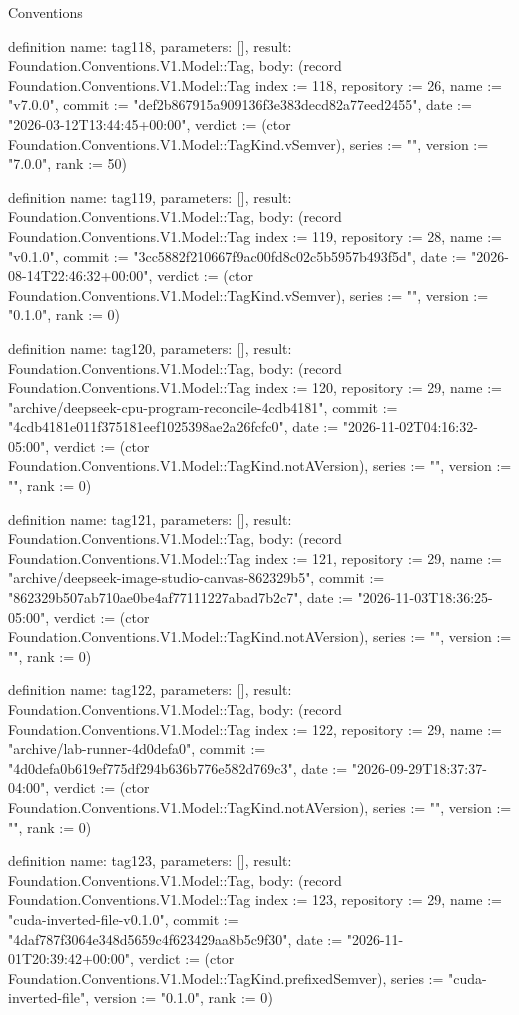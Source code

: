 \begin{lexlean}{Conventions}
\begin{semanticmodule}
definition{
  name: tag118,
  parameters: [],
  result: Foundation.Conventions.V1.Model::Tag,
  body: (record Foundation.Conventions.V1.Model::Tag {index := 118, repository := 26, name := "v7.0.0", commit := "def2b867915a909136f3e383decd82a77eed2455", date := "2026-03-12T13:44:45+00:00", verdict := (ctor Foundation.Conventions.V1.Model::TagKind.vSemver), series := "", version := "7.0.0", rank := 50})
}

definition{
  name: tag119,
  parameters: [],
  result: Foundation.Conventions.V1.Model::Tag,
  body: (record Foundation.Conventions.V1.Model::Tag {index := 119, repository := 28, name := "v0.1.0", commit := "3cc5882f210667f9ac00fd8c02c5b5957b493f5d", date := "2026-08-14T22:46:32+00:00", verdict := (ctor Foundation.Conventions.V1.Model::TagKind.vSemver), series := "", version := "0.1.0", rank := 0})
}

definition{
  name: tag120,
  parameters: [],
  result: Foundation.Conventions.V1.Model::Tag,
  body: (record Foundation.Conventions.V1.Model::Tag {index := 120, repository := 29, name := "archive/deepseek-cpu-program-reconcile-4cdb4181", commit := "4cdb4181e011f375181eef1025398ae2a26fcfc0", date := "2026-11-02T04:16:32-05:00", verdict := (ctor Foundation.Conventions.V1.Model::TagKind.notAVersion), series := "", version := "", rank := 0})
}

definition{
  name: tag121,
  parameters: [],
  result: Foundation.Conventions.V1.Model::Tag,
  body: (record Foundation.Conventions.V1.Model::Tag {index := 121, repository := 29, name := "archive/deepseek-image-studio-canvas-862329b5", commit := "862329b507ab710ae0be4af77111227abad7b2c7", date := "2026-11-03T18:36:25-05:00", verdict := (ctor Foundation.Conventions.V1.Model::TagKind.notAVersion), series := "", version := "", rank := 0})
}

definition{
  name: tag122,
  parameters: [],
  result: Foundation.Conventions.V1.Model::Tag,
  body: (record Foundation.Conventions.V1.Model::Tag {index := 122, repository := 29, name := "archive/lab-runner-4d0defa0", commit := "4d0defa0b619ef775df294b636b776e582d769c3", date := "2026-09-29T18:37:37-04:00", verdict := (ctor Foundation.Conventions.V1.Model::TagKind.notAVersion), series := "", version := "", rank := 0})
}

definition{
  name: tag123,
  parameters: [],
  result: Foundation.Conventions.V1.Model::Tag,
  body: (record Foundation.Conventions.V1.Model::Tag {index := 123, repository := 29, name := "cuda-inverted-file-v0.1.0", commit := "4daf787f3064e348d5659c4f623429aa8b5c9f30", date := "2026-11-01T20:39:42+00:00", verdict := (ctor Foundation.Conventions.V1.Model::TagKind.prefixedSemver), series := "cuda-inverted-file", version := "0.1.0", rank := 0})
}


\end{semanticmodule}
\end{lexlean}
